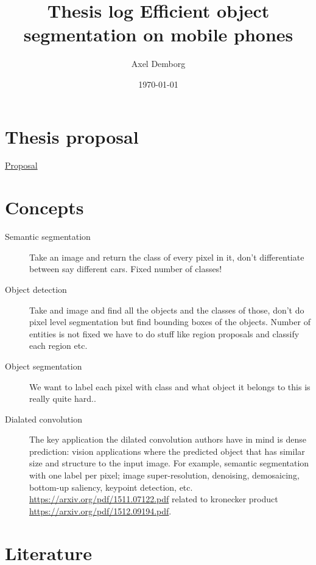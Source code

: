 \documentclass[11pt]{article}
\author{Axel Demborg}
\date{\today}
\title{Thesis log Efficient object segmentation on mobile phones}
\begin{document}
\maketitle
\tableofcontents




\section{Thesis proposal}
\label{sec:org927801d}
\href{proposal.org}{Proposal}

\section{Concepts}
\label{sec:orgf973fb7}
\begin{description}
\item[{Semantic segmentation}] Take an image and return the class of every pixel in it, don't differentiate between say different cars. Fixed number of classes!
\item[{Object detection}] Take and image and find all the objects and the classes of those, don't do pixel level segmentation but find bounding boxes of the objects. Number of entities is not fixed we have to do stuff like region proposals and classify each region etc.
\item[{Object segmentation}] We want to label each pixel with class and what object it belongs to this is really quite hard..
\item[{Dialated convolution}] The key application the dilated convolution authors have in mind is dense prediction: vision applications where the predicted object that has similar size and structure to the input image. For example, semantic segmentation with one label per pixel; image super-resolution, denoising, demosaicing, bottom-up saliency, keypoint detection, etc. \url{https://arxiv.org/pdf/1511.07122.pdf} related to kronecker product \url{https://arxiv.org/pdf/1512.09194.pdf}.
\end{description}

\section{Literature}
\label{sec:org2b672d0}
\end{document}
